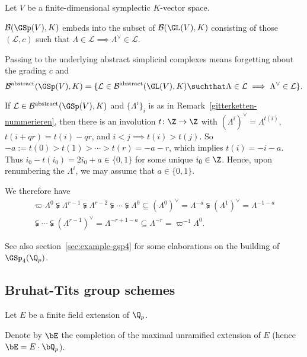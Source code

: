 \documentclass[a4paper]{scrartcl} %
\numberwithin{equation}{section}
\begin{document}
\begin{Remark}\label{gsp-building}
  Let $V$ be a finite-dimensional symplectic $K$-vector space.
  
  $\mathcal{B}(\GSp(V),K)$ embeds into the subset of $\mathcal{B}(\GL(V),K)$ consisting of those $(\mathcal{L},c)$ such that
  $\Lambda\in\mathcal{L}\implies \Lambda^\vee\in \mathcal{L}$.

  Passing to the underlying abstract simplicial complexes means forgetting about the grading $c$ and
  \begin{equation*}
    \mathcal{B}^\mathrm{abstract}(\GSp(V),K) = \{\mathcal{L}\in\mathcal{B}^\mathrm{abstract}(\GL(V),K) \suchthat \Lambda\in\mathcal{L}\implies \Lambda^\vee\in \mathcal{L}\}.
  \end{equation*}

  If $\mathcal{L}\in\mathcal{B}^\mathrm{abstract}(\GSp(V),K)$ and $\{\Lambda^i\}_i$ is as in Remark~\ref{gitterketten-nummerieren}, then there is an involution $t\colon \Z\to\Z$ with $\left(\Lambda^i\right)^\vee=\Lambda^{t(i)}$, $t(i+qr)=t(i)-qr$, and $i< j\implies t(i)> t(j)$. So $-a:=t(0)> t(1)> \dotsb > t(r)=-a-r$, which implies $t(i)=-i-a$. Thus $i_0-t(i_0)=2i_0+a\in\{0,1\}$ for some unique $i_0\in\Z$. Hence, upon renumbering the $\Lambda^i$, we may assume that $a\in\{0,1\}$.

We therefore have
\begin{align*}
  \varpi\Lambda^0\subsetneqq\Lambda^{r-1}\subsetneqq \Lambda^{r-2}\subsetneqq \dotsb \subsetneqq \Lambda^0 \subseteq \left(\Lambda^{0}\right)^\vee=\Lambda^{-a} \subsetneqq \left(\Lambda^{1}\right)^\vee=\Lambda^{-1-a}  \\
  \subsetneqq \dotsb\subsetneqq \left(\Lambda^{r-1}\right)^\vee=\Lambda^{-r+1-a} \subseteq \Lambda^{-r}=\varpi^{-1}\Lambda^0.
\end{align*}
\end{Remark}


\begin{Example}
  See also section~\ref{sec:example-gsp4} for some elaborations on the building of $\GSp_{4}(\Q_p)$.
\end{Example}



\subsection{Bruhat-Tits group schemes}
\label{sec:bruhat-tits-group}

\begin{Notation}
  Let $E$ be a finite field extension of $\Q_p$.
  
  Denote by $\bE$ the completion of the maximal unramified extension of $E$ (hence $\bE=E\cdot\bQ_p$).
\end{Notation}
\end{document}
